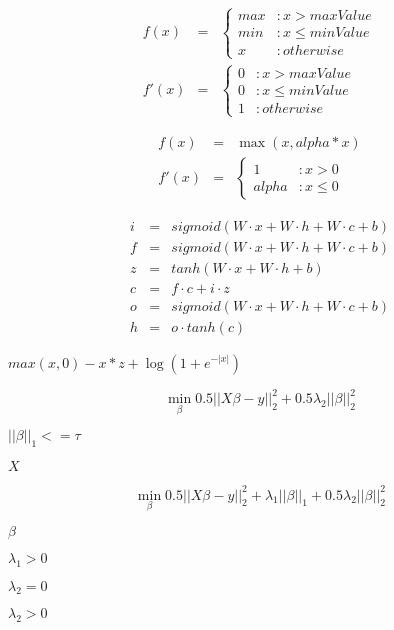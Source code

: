 \documentclass{article}
\begin{document}
\begin{eqnarray*} f(x) &=& \left\{ \begin{array}{lr} max & : x > maxValue \\ min & : x \le minValue \\ x & : otherwise \end{array} \right. \\ f'(x) &=& \left\{ \begin{array}{lr} 0 & : x > maxValue \\ 0 & : x \le minValue \\ 1 & : otherwise \end{array} \right. \end{eqnarray*}
\pagebreak

\begin{eqnarray*} f(x) &=& \max(x, alpha*x) \\ f'(x) &=& \left\{ \begin{array}{lr} 1 & : x > 0 \\ alpha & : x \le 0 \end{array} \right. \end{eqnarray*}
\pagebreak

\begin{eqnarray} i &=& sigmoid(W \cdot x + W \cdot h + W \cdot c + b) \\ f &=& sigmoid(W \cdot x + W \cdot h + W \cdot c + b) \\ z &=& tanh(W \cdot x + W \cdot h + b) \\ c &=& f \cdot c + i \cdot z \\ o &=& sigmoid(W \cdot x + W \cdot h + W \cdot c + b) \\ h &=& o \cdot tanh(c) \end{eqnarray}
\pagebreak

$max(x, 0) - x * z + \log(1 + e^{-|x|})$
\pagebreak

\[ \min_{\beta} 0.5 || X \beta - y ||_2^2 + 0.5 \lambda_2 || \beta ||_2^2 \]
\pagebreak

$ ||\beta||_1 <= \tau $
\pagebreak

$ X $
\pagebreak

\[ \min_{\beta} 0.5 || X \beta - y ||_2^2 + \lambda_1 || \beta ||_1 + 0.5 \lambda_2 || \beta ||_2^2 \]
\pagebreak

$ \beta $
\pagebreak

$ \lambda_1 > 0 $
\pagebreak

$ \lambda_2 = 0 $
\pagebreak

$ \lambda_2 > 0 $
\pagebreak
\end{document}
